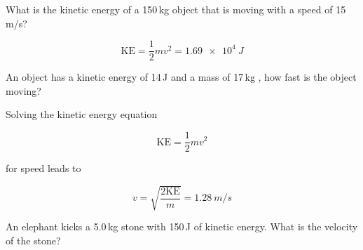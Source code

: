 \documentclass[../main-physics-problems.tex]{subfiles}
\begin{document}
\begin{questions}







\question %
What is the kinetic energy of a 150\,kg object that is moving with a speed of 15\,m/s? 

\begin{solution}
\phantom{.}

\begin{equation*}
    \mathrm{KE} = \frac{1}{2}mv^2 = \boxed{\SI{1.69e4}{J}}
\end{equation*}
\end{solution}

\question %
An object has a kinetic energy of 14\,J and a mass of 17\,kg , how fast is the object moving? 

\begin{solution}
Solving the kinetic energy equation

\begin{equation*}
    \mathrm{KE} = \frac{1}{2} mv^2
\end{equation*}

for speed leads to

\begin{equation*}
    v = \sqrt{\frac{2\mathrm{KE}}{m}} = \boxed{\SI{1.28}{m/s}}
\end{equation*}
\end{solution}

\question %
An elephant kicks a 5.0\,kg stone with 150\,J of kinetic energy. What is the velocity of the stone? 


\end{questions}
\end{document}
